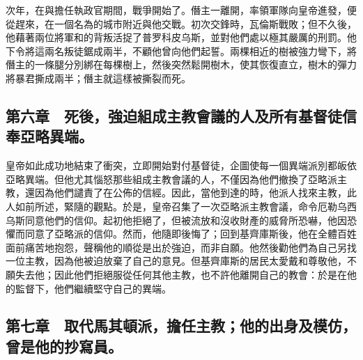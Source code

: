 次年，在與擔任執政官期間，戰爭開始了。僭主一離開，率領軍隊向皇帝進發，便從趕來，在一個名為的城市附近與他交戰。初次交鋒時，瓦倫斯戰敗；但不久後，他藉著兩位將軍和的背叛活捉了普罗科皮乌斯，並對他們處以極其嚴厲的刑罰。他下令將這兩名叛徒鋸成兩半，不顧他曾向他們起誓。兩棵相近的樹被強力彎下，將僭主的一條腿分別綁在每棵樹上，然後突然鬆開樹木，使其恢復直立，樹木的彈力將暴君撕成兩半；僭主就這樣被撕裂而死。\par


\subsection{第六章　死後，強迫組成主教會議的人及所有基督徒信奉亞略異端。}

皇帝如此成功地結束了衝突，立即開始對付基督徒，企圖使每一個異端派別都皈依亞略異端。但他尤其惱怒那些組成主教會議的人，不僅因為他們撤換了亞略派主教，還因為他們譴責了在公佈的信經。因此，當他到達的時，他派人找來主教，此人如前所述，緊隨的觀點。於是，皇帝召集了一次亞略派主教會議，命令厄勒乌西乌斯同意他們的信仰。起初他拒絕了，但被流放和沒收財產的威脅所恐嚇，他因恐懼而同意了亞略派的信仰。然而，他隨即後悔了；回到基齊庫斯後，他在全體百姓面前痛苦地抱怨，聲稱他的順從是出於強迫，而非自願。他然後勸他們為自己另找一位主教，因為他被迫放棄了自己的意見。但基齊庫斯的居民太愛戴和尊敬他，不願失去他；因此他們拒絕服從任何其他主教，也不許他離開自己的教會：於是在他的監督下，他們繼續堅守自己的異端。\par


\subsection{第七章　取代馬其頓派，擔任主教；他的出身及模仿，曾是他的抄寫員。}

